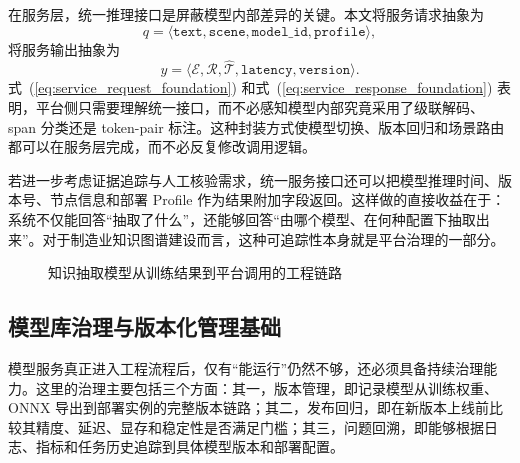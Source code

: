 在服务层，统一推理接口是屏蔽模型内部差异的关键。本文将服务请求抽象为
\begin{equation}
q=\langle \texttt{text},\texttt{scene},\texttt{model\_id},\texttt{profile}\rangle,
\label{eq:service_request_foundation}
\end{equation}
将服务输出抽象为
\begin{equation}
y=\langle \mathcal{E},\mathcal{R},\hat{\mathcal{T}},\texttt{latency},\texttt{version}\rangle.
\label{eq:service_response_foundation}
\end{equation}
式~(\ref{eq:service_request_foundation}) 和式~(\ref{eq:service_response_foundation}) 表明，平台侧只需要理解统一接口，而不必感知模型内部究竟采用了级联解码、span 分类还是 token-pair 标注。这种封装方式使模型切换、版本回归和场景路由都可以在服务层完成，而不必反复修改调用逻辑。

若进一步考虑证据追踪与人工核验需求，统一服务接口还可以把模型推理时间、版本号、节点信息和部署 Profile 作为结果附加字段返回。这样做的直接收益在于：系统不仅能回答“抽取了什么”，还能够回答“由哪个模型、在何种配置下抽取出来”。对于制造业知识图谱建设而言，这种可追踪性本身就是平台治理的一部分。

\begin{figure}[htbp]
  \centering
  \caption{知识抽取模型从训练结果到平台调用的工程链路}
  \label{fig:foundation_service_chain}
\end{figure}

\subsection{模型库治理与版本化管理基础}
模型服务真正进入工程流程后，仅有“能运行”仍然不够，还必须具备持续治理能力。这里的治理主要包括三个方面：其一，版本管理，即记录模型从训练权重、ONNX 导出到部署实例的完整版本链路；其二，发布回归，即在新版本上线前比较其精度、延迟、显存和稳定性是否满足门槛；其三，问题回溯，即能够根据日志、指标和任务历史追踪到具体模型版本和部署配置。

